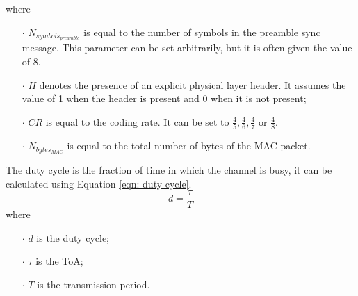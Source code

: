 where
\begin{itemize}[noitemsep,nolistsep]
    \item[\boldmath$\cdot$] $\mathit{N_{symbols_{preamble}}}$ is equal to the number of symbols in the preamble sync message.
        This parameter can be set arbitrarily, but it is often given the value of 8.
    \item[\boldmath$\cdot$] $H$ denotes the presence of an explicit physical layer header. It assumes the
        value of 1 when the header is present and 0 when it is not present;
    \item[\boldmath$\cdot$] $\mathit{CR}$ is equal to the coding rate. It can be set to $\frac{4}{5},\frac{4}{6},
        \frac{4}{7}$ or $\frac{4}{8}$.
    \item[\boldmath$\cdot$] $\mathit{N_{bytes_{MAC}}}$ is equal to the total number of bytes of the \gls{MAC} packet.
\end{itemize}
\vspace{0.55cm}
The duty cycle is the fraction of time in which the channel is busy, it can be calculated using Equation \ref{eqn: duty cycle}.
\begin{equation}
    \label{eqn: duty cycle}
    d = \frac{\tau}{T}
\end{equation}
where
\begin{itemize}[noitemsep,nolistsep]
    \item[\boldmath$\cdot$] $d$ is the duty cycle;
    \item[\boldmath$\cdot$] $\tau$ is the \gls{ToA};
    \item[\boldmath$\cdot$] $T$ is the transmission period.
\end{itemize}


